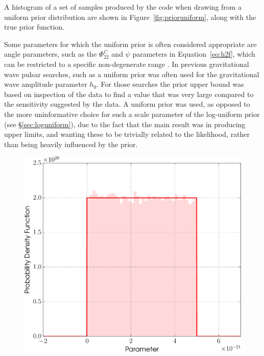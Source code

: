 A histogram of a set of samples produced by the code when drawing from a uniform prior distribution are shown in Figure~\ref{fig:prioruniform},
along with the true prior function.

Some parameters for which the uniform prior is often considered appropriate are angle parameters, such as the $\Phi_{22}^C$ and $\psi$
parameters in Equation~\ref{eq:h2f}, which can be restricted to a specific non-degenerate range \citep[see, e.g., Table~1 in][]{2015MNRAS.453.4399P}. 
In previous gravitational wave pulsar searches, such as \citet{2010ApJ...713..671A,2014ApJ...785..119A} a uniform prior was often used for
the gravitational wave amplitude parameter $h_0$. For those searches the prior upper bound was based on inspection of the data to find a
value that was very large compared to the sensitivity suggested by the data. A uniform prior was used, as opposed to the more
uninformative choice for such a scale parameter of the log-uniform prior (see \S\ref{sec:loguniform}), due to the fact that the main
result was in producing upper limits, and wanting these to be trivially related to the likelihood, rather than being heavily influenced
by the prior.

\begin{figure}[!phtb]
\begin{center}
\includegraphics[width=1\columnwidth]{./figures/priors/uniform/uniform}
\caption{ \protect}
\end{center}
\end{figure}

